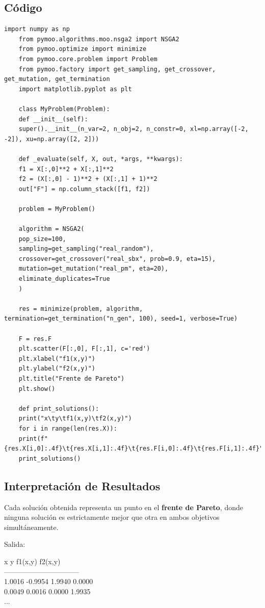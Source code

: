 \documentclass[12pt]{article}
\begin{document}
\subsection*{Código}
\begin{lstlisting}[style=python]
	import numpy as np
	from pymoo.algorithms.moo.nsga2 import NSGA2
	from pymoo.optimize import minimize
	from pymoo.core.problem import Problem
	from pymoo.factory import get_sampling, get_crossover, get_mutation, get_termination
	import matplotlib.pyplot as plt
	
	class MyProblem(Problem):
	def __init__(self):
	super().__init__(n_var=2, n_obj=2, n_constr=0, xl=np.array([-2, -2]), xu=np.array([2, 2]))
	
	def _evaluate(self, X, out, *args, **kwargs):
	f1 = X[:,0]**2 + X[:,1]**2
	f2 = (X[:,0] - 1)**2 + (X[:,1] + 1)**2
	out["F"] = np.column_stack([f1, f2])
	
	problem = MyProblem()
	
	algorithm = NSGA2(
	pop_size=100,
	sampling=get_sampling("real_random"),
	crossover=get_crossover("real_sbx", prob=0.9, eta=15),
	mutation=get_mutation("real_pm", eta=20),
	eliminate_duplicates=True
	)
	
	res = minimize(problem, algorithm, termination=get_termination("n_gen", 100), seed=1, verbose=True)
	
	F = res.F
	plt.scatter(F[:,0], F[:,1], c='red')
	plt.xlabel("f1(x,y)")
	plt.ylabel("f2(x,y)")
	plt.title("Frente de Pareto")
	plt.show()
	
	def print_solutions():
	print("x\ty\tf1(x,y)\tf2(x,y)")
	for i in range(len(res.X)):
	print(f"{res.X[i,0]:.4f}\t{res.X[i,1]:.4f}\t{res.F[i,0]:.4f}\t{res.F[i,1]:.4f}")
	print_solutions()
\end{lstlisting}

\subsection*{Interpretación de Resultados}

Cada solución obtenida representa un punto en el \textbf{frente de Pareto}, donde ninguna solución es estrictamente mejor que otra en ambos objetivos simultáneamente.

Salida:
\begin{center}
	\ttfamily
	x       y       f1(x,y)  f2(x,y) \\
	-------------------------------- \\
	1.0016  -0.9954  1.9940   0.0000 \\
	0.0049   0.0016  0.0000   1.9935 \\
	...
\end{center}
\end{document}
